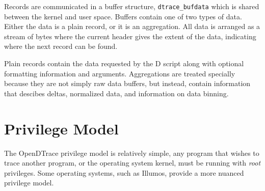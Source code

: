 Records are communicated in a buffer structure, \verb|dtrace_bufdata|
which is shared between the kernel and user space.  Buffers contain
one of two types of data.  Either the data is a plain record, or it is
an aggregation.  All data is arranged as a stream of bytes where the
current header gives the extent of the data, indicating where the next
record can be found.

Plain records contain the data requested by the D script along with
optional formatting information and arguments.  Aggregations are
treated specially because they are not simply raw data buffers, but
instead, contain information that descibes deltas, normalized data,
and information on data binning.

\section{Privilege Model}
\label{sec:privilege}

The OpenDTrace privilege model is relatively simple, any program that
wishes to trace another program, or the operating system kernel, must
be running with \emph{root} privileges.  Some operating systems, such
as Illumos, provide a more nuanced privilege model.

